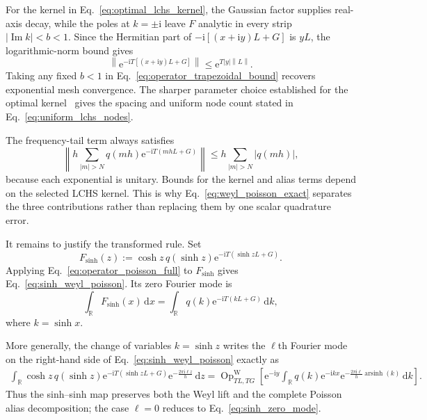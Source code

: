\documentclass[aps,pra,reprint,floatfix,unsortedaddress,superscriptaddress]{revtex4-2}
\newcommand{\norm}[1]{\left\lVert#1\right\rVert}
\newcommand{\abs}[1]{\left\lvert#1\right\rvert}
\begin{document}
For the kernel in Eq.~\eqref{eq:optimal_lchs_kernel}, the Gaussian
factor supplies real-axis decay, while the poles at $k=\pm\mathrm i$
leave $F$ analytic in every strip $\abs{\operatorname{Im}k}<b<1$.
Since the Hermitian part of
$-\mathrm i[(x+\mathrm iy)L+G]$ is $yL$, the
logarithmic-norm bound gives
\begin{equation}
\norm{\mathrm e^{-\mathrm iT[(x+\mathrm iy)L+G]}}
\leq \mathrm e^{T\abs{y}\norm{L}}.
\label{eq:complex_hamiltonian_bound}
\end{equation}
Taking any fixed $b<1$ in
Eq.~\eqref{eq:operator_trapezoidal_bound} recovers exponential mesh
convergence.  The sharper parameter choice established for the
optimal kernel~\cite{low2025optimalquantumsimulationlinear} gives the
spacing and uniform node count stated in
Eq.~\eqref{eq:uniform_lchs_nodes}.

The frequency-tail term always satisfies
\begin{equation}
    \left\|
    h\sum_{\abs{m}>N}
    q(mh)\mathrm e^{-\mathrm iT(mhL+G)}
    \right\|
    \leq
    h\sum_{\abs{m}>N}\abs{q(mh)},
    \label{eq:weyl_tail_bound}
\end{equation}
because each exponential is unitary.  Bounds for the kernel and alias
terms depend on the selected LCHS kernel.  This is why
Eq.~\eqref{eq:weyl_poisson_exact} separates the three contributions
rather than replacing them by one scalar quadrature error.

It remains to justify the transformed rule.  Set
\begin{equation}
    F_{\sinh}(z):=
    \cosh z\,q(\sinh z)
    \mathrm e^{-\mathrm iT(\sinh zL+G)}.
    \label{eq:sinh_operator_integrand}
\end{equation}
Applying Eq.~\eqref{eq:operator_poisson_full} to $F_{\sinh}$ gives
Eq.~\eqref{eq:sinh_weyl_poisson}.  Its zero Fourier mode is
\begin{equation}
    \int_{\mathbb R}F_{\sinh}(x)\,\mathrm dx
    =
    \int_{\mathbb R}q(k)
    \mathrm e^{-\mathrm iT(kL+G)}\,\mathrm dk,
    \label{eq:sinh_zero_mode}
\end{equation}
where $k=\sinh x$.

More generally, the change of variables $k=\sinh z$ writes the
$\ell$th Fourier mode on the right-hand side of
Eq.~\eqref{eq:sinh_weyl_poisson} exactly as
\begin{align}
\int_{\mathbb R}
\cosh z\,q(\sinh z)
\mathrm e^{-\mathrm iT(\sinh zL+G)}
\mathrm e^{-\frac{2\pi\mathrm i\ell z}{h}}\,\mathrm dz
=
\operatorname{Op}^{\mathrm W}_{TL,TG}\!\left[
\mathrm e^{-\mathrm iy}
\int_{\mathbb R}q(k)\mathrm e^{-\mathrm ikx}
\mathrm e^{-\frac{2\pi\mathrm i\ell}{h}
\operatorname{arsinh}(k)}\,\mathrm dk
\right].
\label{eq:sinh_weyl_mode}
\end{align}
Thus the sinh--sinh map preserves both the Weyl lift and the complete
Poisson alias decomposition; the case $\ell=0$ reduces to
Eq.~\eqref{eq:sinh_zero_mode}.
\end{document}
